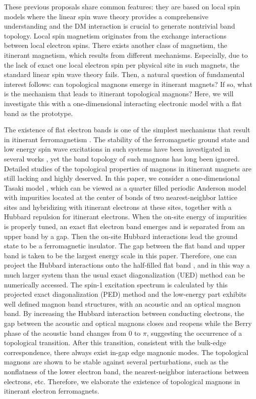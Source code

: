 \documentclass[amsmath,superscriptaddress,showpacs,aps,prb,twocolumn]{revtex4-1}
\begin{document}
\par These previous proposals share common features: they are based on local spin models where the linear spin wave theory provides a comprehensive understanding and the DM interaction is crucial to generate nontrivial band topology. Local spin magnetism originates from the exchange interactions between local electron spins. There exists another class of magnetism, the itinerant magnetism, which results from different mechanisms. Especially, due to the lack of exact one local electron spin per physical site in such magnets, the standard linear spin wave theory fails. Then, a natural question of fundamental interest follows: can topological magnons emerge in itinerant magnets? If so, what is the mechanism that leads to itinerant topological magnons? Here, we will investigate this with a one-dimensional interacting electronic model with a flat band as the prototype.

\par The existence of flat electron bands is one of the simplest mechanisms that result in itinerant ferromagnetism \cite{T_PRL1992,M_PLA1993,MT_CMP1993}. The stability of the ferromagnetic ground state and low energy spin wave excitations in such systems have been investigated in several works \cite{T_PRL1994,KA_PRL1994,DG_PRB2015}, yet the band topology of such magnons has long been ignored. Detailed studies of the topological properties of magnons in itinerant magnets are still lacking and highly deserved. In this paper, we consider a one-dimensional Tasaki model \cite{T_PRL1992,T_PTP1998}, which can be viewed as a quarter filled periodic Anderson model with impurities located at the center of bonds of two nearest-neighbor lattice sites and hybridizing with itinerant electrons at these sites, together with a Hubbard repulsion for itinerant electrons. When the on-site energy of impurities is properly tuned, an exact flat electron band emerges and is separated from an upper band by a gap. Then the on-site Hubbard interactions lead the ground state to be a ferromagnetic insulator. The gap between the flat band and upper band is taken to be the largest energy scale in this paper. Therefore, one can project the Hubbard interactions onto the half-filled flat band \cite{KA_PRL1994,T_PTP1998}, and in this way a much larger system than the usual exact diagonalization (UED) method can be numerically accessed. The spin-1 excitation spectrum is calculated by this projected exact diagonalization (PED) method and the low-energy part exhibits well defined magnon band structures, with an acoustic and an optical magnon band. By increasing the Hubbard interaction between conducting electrons, the gap between the acoustic and optical magnons closes and reopens while the Berry phase of the acoustic band changes from 0 to $\pi$, suggesting the occurrence of a topological transition. After this transition, consistent with the bulk-edge correspondence, there always exist in-gap edge magnonic modes. The topological magnons are shown to be stable against several perturbations, such as the nonflatness of the lower electron band, the nearest-neighbor interactions between electrons, etc. Therefore, we elaborate the existence of topological magnons in itinerant electron ferromagnets.
\end{document}
